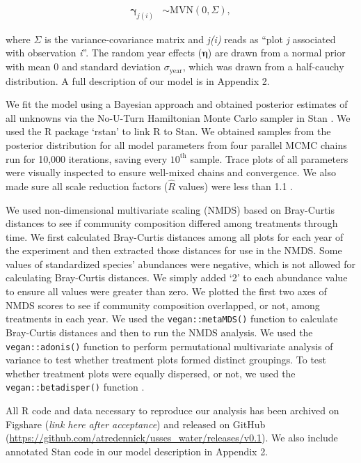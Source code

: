\documentclass[fleqn,10pt,lineno]{wlpeerj} %
\begin{document}
\begin{align}
\boldsymbol{\gamma}_{j(i)} &\sim \text{MVN} \left( 0, \Sigma  \right),
\end{align}

\noindent{}where \(\Sigma\) is the variance-covariance matrix and
\emph{j(i)} reads as ``plot \emph{j} associated with observation
\emph{i}''. The random year effects (\(\boldsymbol{\eta}\)) are drawn
from a normal prior with mean 0 and standard deviation
\(\sigma_{\text{year}}\), which was drawn from a half-cauchy
distribution. A full description of our model is in Appendix 2.

We fit the model using a Bayesian approach and obtained posterior
estimates of all unknowns via the No-U-Turn Hamiltonian Monte Carlo
sampler in Stan \citep{stan2016}. We used the R package `rstan'
\citep{rstan2016} to link R \citep{R2016} to Stan. We obtained samples
from the posterior distribution for all model parameters from four
parallel MCMC chains run for 10,000 iterations, saving every
\(10^{\text{th}}\) sample. Trace plots of all parameters were visually
inspected to ensure well-mixed chains and convergence. We also made sure
all scale reduction factors (\(\hat{R}\) values) were less than 1.1
\citep{Gelman2009}.

We used non-dimensional multivariate scaling (NMDS) based on Bray-Curtis
distances to see if community composition differed among treatments
through time. We first calculated Bray-Curtis distances among all plots
for each year of the experiment and then extracted those distances for
use in the NMDS. Some values of standardized species' abundances were
negative, which is not allowed for calculating Bray-Curtis distances. We
simply added `2' to each abundance value to ensure all values were
greater than zero. We plotted the first two axes of NMDS scores to see
if community composition overlapped, or not, among treatments in each
year. We used the \texttt{vegan::metaMDS()} function \citep{Oksanen2016}
to calculate Bray-Curtis distances and then to run the NMDS analysis. We
used the \texttt{vegan::adonis()} function \citep{Oksanen2016} to
perform permutational multivariate analysis of variance to test whether
treatment plots formed distinct groupings. To test whether treatment
plots were equally dispersed, or not, we used the
\texttt{vegan::betadisper()} function \citep{Oksanen2016}.

All R code and data necessary to reproduce our analysis has been
archived on Figshare (\emph{link here after acceptance}) and released on
GitHub (\url{https://github.com/atredennick/usses_water/releases/v0.1}).
We also include annotated Stan code in our model description in Appendix
2.
\end{document}
